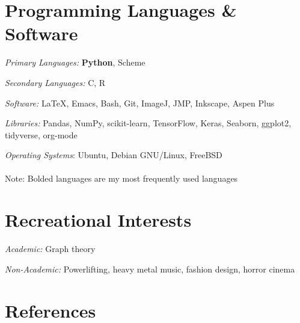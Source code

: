 \documentclass[letterpaper]{article}
\renewenvironment{itemize}{
  \begin{list}{}{
    \setlength{\leftmargin}{1.5em}
  }
}{
  \end{list}
}
\begin{document}

\section*{\textbf{Programming Languages \& Software}}
\begin{itemize}
    \item \textit{Primary Languages:} \textbf{Python}, Scheme
    \item \textit{Secondary Languages:} C, R
    \item \textit{Software:} \LaTeX, Emacs, Bash, Git, ImageJ, JMP, Inkscape, Aspen Plus
    \item \textit{Libraries:} Pandas, NumPy, scikit-learn, TensorFlow, Keras, Seaborn, ggplot2, tidyverse, org-mode
    \item \textit{Operating Systems}: Ubuntu, Debian GNU/Linux, FreeBSD\\\\
    \tiny{Note: Bolded languages are my most frequently used languages}
\end{itemize}

\section*{\textbf{Recreational Interests}}
\begin{itemize}
\item \textit{Academic:} Graph theory
\item \textit{Non-Academic:} Powerlifting, heavy metal music, fashion design, horror cinema
\end{itemize}

\section*{\textbf{References}}
\end{document}
